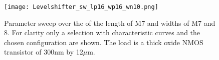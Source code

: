 \begin{figure}[h]
 \texttt{[image: Levelshifter\_sw\_lp16\_wp16\_wn10.png]}
 \caption{Parameter sweep over the of the length of M7 and widths of M7 and 8. For clarity only a selection with characteristic curves and the chosen configuration are shown. The load is a thick oxide NMOS transistor of 300nm by 12$\mu$m.}
 \label{fig:levelshifter_sweep_NMOS}
\end{figure}


